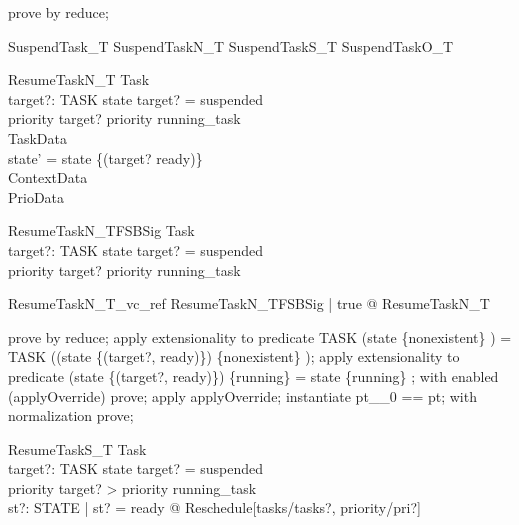 \begin{zproof}
prove by reduce;
\end{zproof}

\begin{zed}
SuspendTask\_T  SuspendTaskN\_T \lor  SuspendTaskS\_T \lor  SuspendTaskO\_T
\end{zed}

\begin{schema}{ResumeTaskN\_T}
  \Delta Task\\
  target?: TASK
\where
  state target? = suspended\\
  priority target? \leq  priority running\_task\\
  \Xi TaskData\\
  state' = state \oplus  \{(target? \mapsto  ready)\}\\
  \Xi ContextData\\
  \Xi PrioData
\end{schema}

\begin{schema}{ResumeTaskN\_TFSBSig}
  Task\\
  target?: TASK
\where
  state target? = suspended\\
  priority target? \leq  priority running\_task
\end{schema}

\begin{theorem}{ResumeTaskN\_T\_vc\_ref}
\forall  ResumeTaskN\_TFSBSig | true @ \pre  ResumeTaskN\_T
\end{theorem}

\begin{zproof}
prove by reduce;
apply extensionality to predicate TASK \setminus  (state \inv  \limg  \{nonexistent\} \rimg ) = TASK \setminus  ((state \oplus  \{(target?, ready)\}) \inv  \limg  \{nonexistent\} \rimg );
apply extensionality to predicate (state \oplus  \{(target?, ready)\}) \inv  \limg  \{running\} \rimg  = state \inv  \limg  \{running\} \rimg ;
with enabled (applyOverride) prove;
apply applyOverride;
instantiate pt\_\_0 == pt;
with normalization prove;
\end{zproof}

\begin{schema}{ResumeTaskS\_T}
  \Delta Task\\
  target?: TASK
\where
  state target? = suspended\\
  priority target? > priority running\_task\\
  \exists  st?: STATE | st? = ready @ Reschedule[tasks/tasks?, priority/pri?]
\end{schema}


